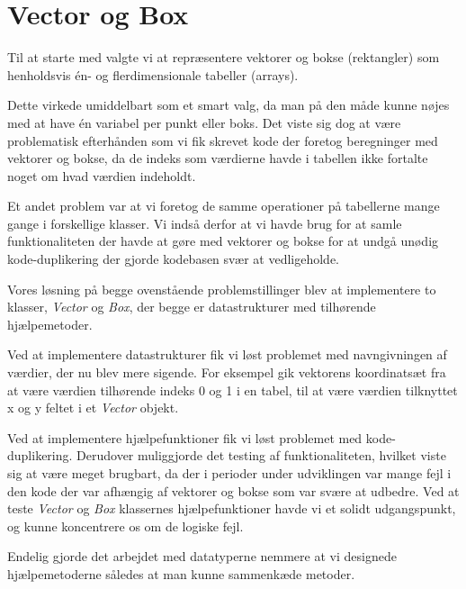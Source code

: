 \section{Vector og Box}

Til at starte med valgte vi at repræsentere vektorer og bokse (rektangler) som henholdsvis én- og flerdimensionale tabeller (arrays).

Dette virkede umiddelbart som et smart valg, da man på den måde kunne nøjes med at have én variabel per punkt eller boks. Det viste sig dog at være problematisk efterhånden som vi fik skrevet kode der foretog beregninger med vektorer og bokse, da de indeks som værdierne havde i tabellen ikke fortalte noget om hvad værdien indeholdt.

Et andet problem var at vi foretog de samme operationer på tabellerne mange gange i forskellige klasser. Vi indså derfor at vi havde brug for at samle funktionaliteten der havde at gøre med vektorer og bokse for at undgå unødig kode-duplikering der gjorde kodebasen svær at vedligeholde.

Vores løsning på begge ovenstående problemstillinger blev at implementere to klasser, \emph{Vector} og \emph{Box}, der begge er datastrukturer med tilhørende hjælpemetoder.

Ved at implementere datastrukturer fik vi løst problemet med navngivningen af værdier, der nu blev mere sigende. For eksempel gik vektorens koordinatsæt fra at være værdien tilhørende indeks 0 og 1 i en tabel, til at være værdien tilknyttet x og y feltet i et \emph{Vector} objekt.

Ved at implementere hjælpefunktioner fik vi løst problemet med kode-duplikering. Derudover muliggjorde det testing af funktionaliteten, hvilket viste sig at være meget brugbart, da der i perioder under udviklingen var mange fejl i den kode der var afhængig af vektorer og bokse som var svære at udbedre. Ved at teste \emph{Vector} og \emph{Box} klassernes hjælpefunktioner havde vi et solidt udgangspunkt, og kunne koncentrere os om de logiske fejl.

Endelig gjorde det arbejdet med datatyperne nemmere at vi designede hjælpemetoderne således at man kunne sammenkæde metoder.